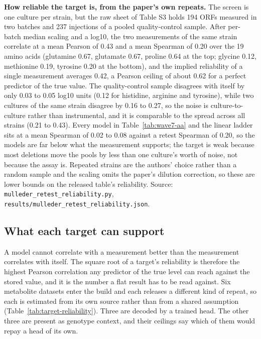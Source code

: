 \textbf{How reliable the target is, from the paper's own repeats.} The screen is one culture
per strain, but the raw sheet of Table S3 holds 194 ORFs measured in two batches and 237
injections of a pooled quality-control sample. After per-batch median scaling and a log10,
the two measurements of the same strain correlate at a mean Pearson of 0.43 and a mean
Spearman of 0.20 over the 19 amino acids (glutamine 0.67, glutamate 0.67, proline 0.64 at
the top; glycine 0.12, methionine 0.19, tyrosine 0.20 at the bottom), and the implied
reliability of a single measurement averages 0.42, a Pearson ceiling of about 0.62 for a
perfect predictor of the true value. The quality-control sample disagrees with itself by
only 0.03 to 0.05 log10 units (0.12 for histidine, arginine and tyrosine), while two
cultures of the same strain disagree by 0.16 to 0.27, so the noise is culture-to-culture
rather than instrumental, and it is comparable to the spread across all strains (0.21 to
0.43). Every model in Table~\ref{tab:wave7-aa} and the linear ladder sits at a
mean Spearman of 0.02 to 0.08 against a retest Spearman of 0.20, so the models are far
below what the measurement supports; the target is weak because most deletions move the
pools by less than one culture's worth of noise, not because the assay is. Repeated
strains are the authors' choice rather than a random sample and the scaling omits the
paper's dilution correction, so these are lower bounds on the released table's reliability.
Source: \texttt{mulleder\_retest\_reliability.py}, \texttt{results/mulleder\_retest\_reliability.json}.


\subsection{What each target can support}

A model cannot correlate with a measurement better than the measurement correlates with
itself. The square root of a target's reliability is therefore the highest Pearson
correlation any predictor of the true level can reach against the stored value, and it is
the number a flat result has to be read against. Six metabolite datasets enter the build and
each releases a different kind of repeat, so each is estimated from its own source rather
than from a shared assumption (Table~\ref{tab:target-reliability}). Three are decoded by a
trained head. The other three are present as genotype context, and their ceilings say which
of them would repay a head of its own.

